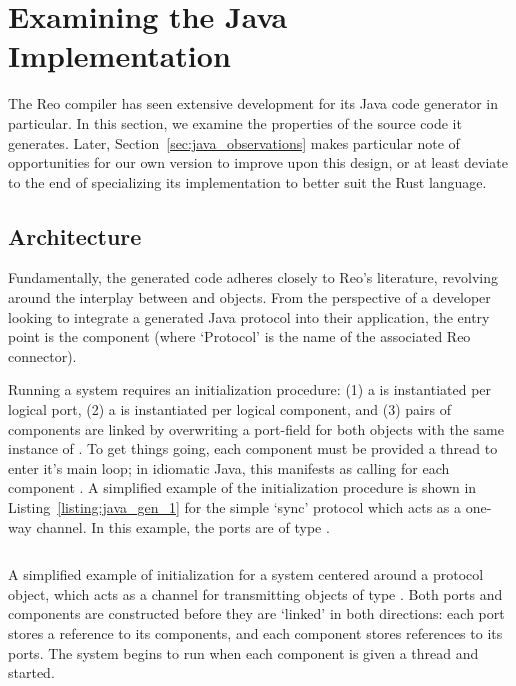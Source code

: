 \section{Examining the Java Implementation}
\label{sec:java_examined}
The Reo compiler has seen extensive development for its Java code generator in particular. In this section, we examine the properties of the source code it generates. Later, Section~\ref{sec:java_observations} makes particular note of opportunities for our own version to improve upon this design, or at least deviate to the end of specializing its implementation to better suit the Rust language.

\subsection{Architecture}
Fundamentally, the generated code adheres closely to Reo's literature, revolving around the interplay between  and  objects. From the perspective of a developer looking to integrate a generated Java protocol into their application, the entry point is the  component (where `Protocol' is the name of the associated Reo connector).

Running a system requires an initialization procedure: (1) a  is instantiated per logical port, (2) a  is instantiated per logical component, and (3) pairs of components are linked by overwriting a port-field for both objects with the same instance of . To get things going, each component must be provided a thread to enter it's main loop; in idiomatic Java, this manifests as calling  for each component . A simplified example of the initialization procedure is shown in Listing~\ref{listing:java_gen_1} for the simple `sync' protocol which acts as a one-way channel. In this example, the ports are of type .


\begin{listing}[ht]
	\centering
	\inputminted[]{java}{java_gen_1.java}
	\caption[Reo-generated Java protocol initialization.]{A simplified example of initialization for a system centered around a  protocol object, which acts as a channel for transmitting objects of type . Both ports and components are constructed before they are `linked' in both directions: each port stores a reference to its components, and each component stores references to its ports. The system begins to run when each component is given a thread and started.}
	\label{listing:java_gen_1}
\end{listing}


